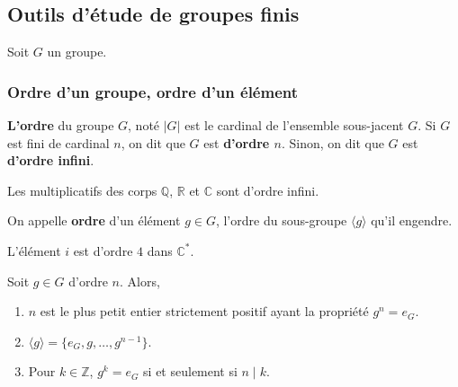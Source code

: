 




  \subsection{Outils d'étude de groupes finis}

  Soit $G$ un groupe.

  \subsubsection{Ordre d'un groupe, ordre d'un élément}


  \begin{definition}
    \textbf{L'ordre} du groupe $G$, noté $|G|$ est le cardinal de l'ensemble sous-jacent $G$. Si $G$ est fini de cardinal $n$, on dit que $G$ est \textbf{d'ordre $n$}. Sinon, on dit que $G$ est \textbf{d'ordre infini}.
  \end{definition}

  \begin{example}
    Les multiplicatifs des corps $\mathbb{Q}$, $\mathbb{R}$ et $\mathbb{C}$ sont d'ordre infini.
  \end{example}


  \begin{definition}
    On appelle \textbf{ordre} d'un élément $g \in G$, l'ordre du sous-groupe $\langle g \rangle$ qu'il engendre.
  \end{definition}

  \begin{example}
    L'élément $i$ est d'ordre $4$ dans $\mathbb{C}^*$.
  \end{example}

  \begin{proposition}
    Soit $g \in G$ d'ordre $n$. Alors,
    \begin{enumerate}[label={\bfseries(\roman*)}]
      \item $n$ est le plus petit entier strictement positif ayant la propriété $g^n = e_G$.
      \item $\langle g \rangle = \{ e_G, g, \dots, g^{n-1} \}$.
      \item Pour $k \in \mathbb{Z}$, $g^k = e_G$ si et seulement si $n \mid k$.
    \end{enumerate}
  \end{proposition}

